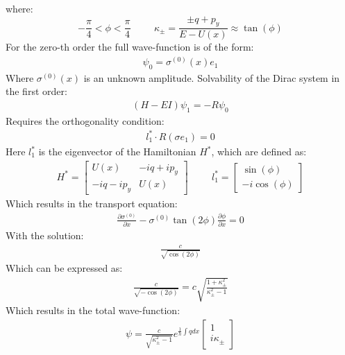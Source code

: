 			where:
			\begin{equation}
				-\frac{\pi}{4}<\phi<\frac{\pi}{4}\hspace{1cm}\kappa_{\pm}=\frac{\pm q+p_{y}}{E-U\left(x\right)}\approx \tan(\phi)
			\end{equation}
			For the zero-th order the full wave-function is of the form:
			\begin{gather}
				\psi_{0}=\sigma^{\left(0\right)}\left(x\right)e_{1}
			\end{gather}
			Where $\sigma^{\left(0\right)}\left(x\right)$ is an unknown amplitude. Solvability of the Dirac system in the first order:
			\begin{gather}
				\left(H-EI\right)\psi_{1}=-R\psi_{0}
			\end{gather}
			Requires the orthogonality condition:
			\begin{gather}
				l_{1}^{*}\cdot R\left(\sigma e_{1}\right)=0
			\end{gather}
			Here $l_{1}^{*}$ is the eigenvector of the Hamiltonian $H^{*}$, which are defined as:
			\begin{align}
				H^{*}=
				\left[\begin{array}{cc}
					U\left(x\right)&-iq+ip_{y}\\
					-iq-ip_{y}&U\left(x\right)
				\end{array}\right]
				\hspace{1cm}
				l_{1}^{*}=
				\left[\begin{array}{cc}
					\sin(\phi)\\
					-i\cos(\phi)
				\end{array}\right]	
			\end{align}
			Which results in the transport equation:
			\begin{gather}
				\frac{\partial\sigma^{\left(0\right)}}{\partial x}-\sigma^{\left(0\right)}\tan(2\phi)\frac{\partial\phi}{\partial x}=0
			\end{gather}
			With the solution:
			\begin{gather}
				\frac{c}{\sqrt{\cos(2\phi)}}
			\end{gather}
			Which can be expressed as:
			\begin{gather}
				\frac{c}{\sqrt{-\cos(2\phi)}}=c\sqrt{\frac{1+\kappa_{\pm}^{2}}{\kappa_{\pm}^{2}-1}}
			\end{gather}
			Which results in the total wave-function:
			\begin{gather}
				\psi=\frac{c}{\sqrt{\kappa_{\pm}^{2}-1}}e^{\frac{1}{h}\int qdx}
				\left[\begin{array}{cc}
					1\\
					i\kappa_{\pm}
				\end{array}\right]
			\end{gather}

